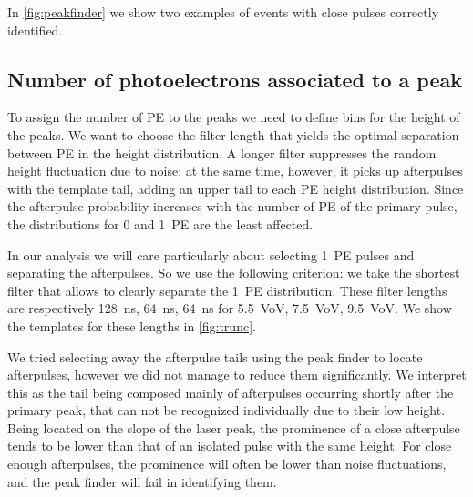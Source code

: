 In \autoref{fig:peakfinder} we show two examples of events with close pulses
correctly identified.

\begin{figure}
    
    
    
\end{figure}

\subsection{Number of photoelectrons associated to a peak}
\label{sec:pe}

To assign the number of PE to the peaks we need to define bins for the height
of the peaks. We want to choose the filter length that yields the optimal
separation between PE in the height distribution. A longer filter suppresses
the random height fluctuation due to noise; at the same time, however, it picks
up afterpulses with the template tail, adding an upper tail to each PE height
distribution. Since the afterpulse probability increases with the number of PE
of the primary pulse, the distributions for 0 and 1~PE are the least affected.

In our analysis we will care particularly about selecting 1~PE pulses and
separating the afterpulses. So we use the following criterion: we take the
shortest filter that allows to clearly separate the 1~PE distribution. These
filter lengths are respectively \SI{128}{ns}, \SI{64}{ns}, \SI{64}{ns} for
\SI{5.5}{VoV}, \SI{7.5}{VoV}, \SI{9.5}{VoV}. We show the templates for these
lengths in \autoref{fig:trunc}.

\begin{figure}

    
    
\end{figure}

We tried selecting away the afterpulse tails using the peak finder to locate
afterpulses, however we did not manage to reduce them significantly. We
interpret this as the tail being composed mainly of afterpulses occurring
shortly after the primary peak, that can not be recognized individually due to
their low height. Being located on the slope of the laser peak, the prominence
of a close afterpulse tends to be lower than that of an isolated pulse with the
same height. For close enough afterpulses, the prominence will often be lower
than noise fluctuations, and the peak finder will fail in identifying them.

